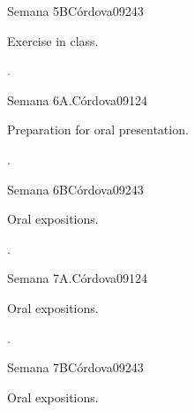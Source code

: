 \begin{syllabus}
\begin{unit}{Semana 5B}{}{Córdova09}{24}{3}
   \begin{topics}
      \item Exercise in class.
   \end{topics}

   \begin{learningoutcomes}
      \item . 
      \end{learningoutcomes}
\end{unit}

\begin{unit}{Semana 6A.}{}{Córdova09}{12}{4}
   \begin{topics}
      \item Preparation for oral presentation. 
   \end{topics}
   \begin{learningoutcomes}
      \item .
   \end{learningoutcomes}
\end{unit}

\begin{unit}{Semana 6B}{}{Córdova09}{24}{3}
   \begin{topics}
      \item Oral expositions.
   \end{topics}

   \begin{learningoutcomes}
      \item .
      \end{learningoutcomes}
\end{unit}


\begin{unit}{Semana 7A.}{}{Córdova09}{12}{4}
   \begin{topics}
      \item Oral expositions.
   \end{topics}
   \begin{learningoutcomes}
      \item .
   \end{learningoutcomes}
\end{unit}

\begin{unit}{Semana 7B}{}{Córdova09}{24}{3}
   \begin{topics}
      \item Oral expositions.
   \end{topics}


\end{unit}
\end{syllabus}

